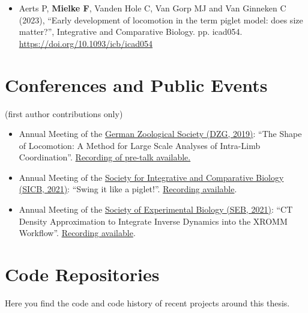 \begin{change}
\begin{itemize}
\item Aerts P, \textbf{Mielke F}, Vanden Hole C, Van Gorp MJ and Van Ginneken C (2023), ``Early development of locomotion in the term piglet model: does size matter?'', Integrative and Comparative Biology. pp. icad054. \url{https://doi.org/10.1093/icb/icad054}
\end{itemize}

\section{Conferences and Public Events}
\label{sec:org221cece}
(first author contributions only)

\begin{itemize}
\item Annual Meeting of the \href{https://www.dzg-ev.de/veranstaltungen/jahrestagungen}{German Zoological Society (DZG, 2019)}: ``The Shape of Locomotion: A Method for Large Scale Analyses of Intra-Limb Coordination''. \href{http://mielke-bio.info/falk/posts/05.dzg}{Recording of pre-talk available.}

\item Annual Meeting of the \href{https://sicb.org/meetings/sicb-annual-meeting-2021/}{Society for Integrative and Comparative Biology (SICB, 2021)}: ``Swing it like a piglet!''. \href{http://mielke-bio.info/falk/posts/29.sicb2021}{Recording available}.

\item Annual Meeting of the \href{https://www.sebiology.org/resource/seb-2021-annual-conference.html}{Society of Experimental Biology (SEB, 2021)}: ``CT Density Approximation to Integrate Inverse Dynamics into the XROMM Workflow''. \href{http://mielke-bio.info/falk/posts/26.seb2021}{Recording available}.
\end{itemize}

\section{Code Repositories}
\label{sec:org207aee5}
Here you find the code and code history of recent projects around this thesis.


\end{change}
